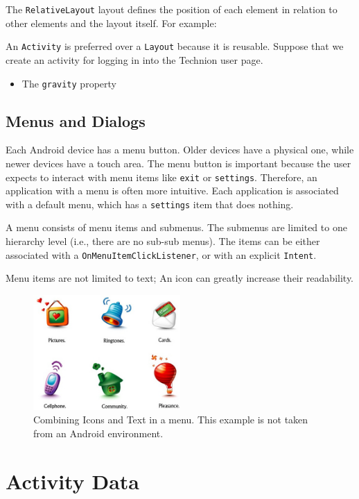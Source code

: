 \documentclass{article}
\begin{document}
The \texttt{RelativeLayout} layout defines the position of each element in relation to other elements and the layout itself. For example:

An \texttt{Activity} is preferred over a \texttt{Layout} because it is reusable. Suppose that we create an activity for logging in into the Technion user page. 

\begin{itemize}
\item The \texttt{gravity} property
\end{itemize}

\subsection{Menus and Dialogs}

Each Android device has a menu button. Older devices have a physical one, while newer devices have a touch area. The menu button is important because the user expects to interact with menu items like \texttt{exit} or  \texttt{settings}. Therefore, an application with a menu is often more intuitive. Each application is associated with a default menu, which has a \texttt{settings} item that does nothing.

A menu consists of menu items and submenus. The submenus are limited to one hierarchy level (i.e., there are no sub-sub menus). The items can be either associated with a \texttt{OnMenuItemClickListener}, or with an explicit \texttt{Intent}.

Menu items are not limited to text;  An icon can greatly increase their readability.

\begin{figure}[h!]
  \centering
      \includegraphics[width=0.5\textwidth]{img/icons.jpeg}
  \caption{Combining Icons and Text in a menu. This example is not taken from an Android environment.}
\end{figure}

\section{Activity Data}
\end{document}
